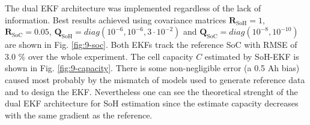 The dual EKF architecture was implemented regardless of the lack of information. Best results achieved using covariance matrices $\mathbf{R}_{\text{SoH}} = 1$, $\mathbf{R}_{\text{SoC}} = 0.05$, $\mathbf{Q}_{\text{SoH}} = diag(10^{-6}, 10^{-6}, 3\cdot 10^{-2})$ and $\mathbf{Q}_{\text{SoC}} = diag(10^{-8}, 10^{-10})$ are shown in Fig. \ref{fig:9-soc}. Both EKFs track the reference SoC with RMSE of 3.0 \%  over the whole experiment. The cell capacity $C$ estimated by SoH-EKF is shown in Fig. \ref{fig:9-capacity}. There is some non-negligible error (a 0.5 Ah bias) caused most probably by the mismatch of models used to generate reference data and to design the EKF. Nevertheless one can see the theoretical strenght of the dual EKF architecture for SoH estimation since the estimate capacity decreases with the same gradient as the reference.

